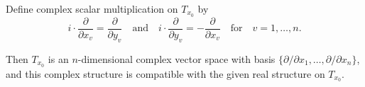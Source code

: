 Define complex scalar multiplication on $T_{x_0}$ by
$$i \cdot \frac{\partial}{\partial x_v} = \frac{\partial}{\partial y_v} \quad \text{and} \quad i \cdot \frac{\partial}{\partial y_v} = -\frac{\partial}{\partial x_v} \quad \text{for} \quad v = 1, \ldots, n.$$

Then $T_{x_0}$ is an $n$-dimensional complex vector space with basis $\{\partial/\partial x_1, \ldots, \partial/\partial x_n\}$, and this complex structure is compatible with the given real structure on $T_{x_0}$.
